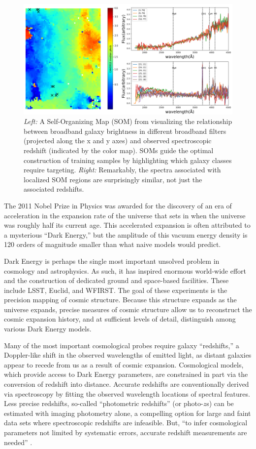 \documentclass[oneside,11pt]{amsart}
\begin{document}
\begin{figure}[h!]
 \vskip -0.1in
 \includegraphics[width=\textwidth]{Hemmati18_Fig8_VVDS_spec.png}
 \caption{\small \emph{Left:} A Self-Organizing Map (SOM) from \citet{hemmati18} visualizing the relationship between
 broadband galaxy brightness in different broadband filters (projected along the x and y axes) and observed
 spectroscopic redshift (indicated by the color map).  SOMs guide the optimal construction of training samples by
 highlighting which galaxy classes require targeting.  \emph{Right:} Remarkably, the spectra associated with localized
 SOM regions are surprisingly similar, not just the associated redshifts.}\label{fig:SOM}
\end{figure}

The 2011 Nobel Prize in Physics was awarded for the discovery of an era of acceleration in the expansion rate of the
universe that sets in when the universe was roughly half its current age.  This accelerated expansion is often
attributed to a mysterious ``Dark Energy,'' but the amplitude of this vacuum energy density is 120 orders of magnitude
smaller than what naive models would predict.

Dark Energy is perhaps the single most important unsolved problem in cosmology and astrophysics.  As such, it has
inspired enormous world-wide effort and the construction of dedicated ground and space-based facilities.  These include
LSST, Euclid, and WFIRST.  The goal of these experiments is the precision mapping of cosmic structure.  Because this
structure expands as the universe expands, precise measures of cosmic structure allow us to reconstruct the cosmic
expansion history, and at sufficient levels of detail, distinguish among various Dark Energy models.

Many of the most important cosmological probes require galaxy ``redshifts,'' a Doppler-like shift in the observed
wavelengths of emitted light, as distant galaxies appear to recede from us as a result of cosmic expansion.
Cosmological models, which provide access to Dark Energy parameters, are constrained in part via the conversion of
redshift into distance.  Accurate redshifts are conventionally derived via spectroscopy by fitting the observed
wavelength locations of spectral features.  Less precise redshifts, so-called ``photometric redshifts'' (or photo-$z$s) can be estimated with imaging photometry alone, a
compelling option for large and faint data sets where spectroscopic redshifts are infeasible.  But, ``to infer
cosmological parameters not limited by systematic errors, accurate redshift measurements are needed'' \citep
{hemmati18}.  
\end{document}

